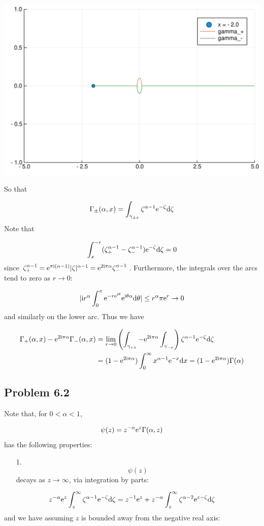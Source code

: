 \documentclass[12pt,a4paper]{article}
\def\D{ {\rm d} }
\def\I{ {\rm i} }
\def\E{ {\rm e} }
\def\addtab#1={#1\;&=}
\def\ccr{\\\addtab}
\def\dx{\D x}
\def\addtab#1={#1\;&=}
\def\ccr{\\\addtab}
\begin{document}
\includegraphics[width=\linewidth]{figures/Solutions3_20_1.pdf}

So that

\[
\Gamma_\pm(\alpha, x) = \int_{\gamma_{\pm x}} \zeta^{\alpha-1} \E^{-\zeta} \D \zeta
\]
Note that

\[
\int_x^{-r} (\zeta_+^{\alpha - 1} - \zeta_-^{\alpha -1}) \E^{-\zeta} \D\zeta = 0
\]
since $\zeta_+^{\alpha-1} = \E^{\pi \I (\alpha-1)}|\zeta|^{\alpha-1} = \E^{2 \I \pi \alpha} \zeta_-^{\alpha-1}$. Furthermore, the integrals over the arcs tend to zero as $r \rightarrow 0$:

\[
|\I r^\alpha \int_0^\pi \E^{- r \E^{\I \theta}} \E^{\I \theta \alpha} \D \theta  | \leq r^\alpha \pi \E^r  \rightarrow 0
\]
and similarly on the lower arc. Thus we have


\begin{align*}
\Gamma_+(\alpha, x)-\E^{2 \I \pi \alpha} \Gamma_-(\alpha, x) &= \lim_{r \rightarrow 0 } \left(\int_{\gamma_{+x}} - \E^{2 \I \pi \alpha} \int_{\gamma_{-x}}\right) \zeta^{\alpha-1} \E^{-\zeta} \D \zeta \ccr
 = (1 - \E^{2 \I \pi \alpha})\int_0^\infty x^{\alpha-1} \E^{-x} \dx = (1 - \E^{2 \I \pi \alpha})\Gamma(\alpha)
\end{align*}
\subsection{Problem 6.2}
Note that, for $0 < \alpha < 1$,

\[
    \psi(z) = z^{-\alpha} \E^z \Gamma(\alpha, z)
\]
has the following properties:

\begin{itemize}
\item[1. ] \[
\psi(z)
\]
decays as $z \rightarrow \infty$, via integration by parts:

\end{itemize}
\[
    z^{-\alpha} \E^z \int_z^\infty \zeta^{\alpha-1} \E^{-\zeta} \D \zeta =
    z^{-1} \E^z + z^{-\alpha} \int_z^\infty \zeta^{\alpha-2} \E^{z-\zeta} \D \zeta
\]
and we have assuming $z$ is bounded away from the negative real axis:
\end{document}
